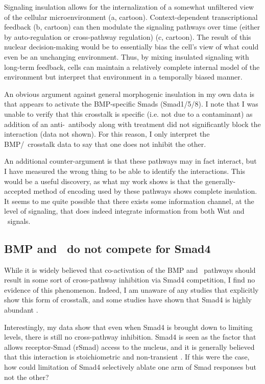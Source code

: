 Signaling insulation allows for the internalization of a
somewhat unfiltered view of the cellular microenvironment
(a, cartoon).
Context-dependent transcriptional feedback
(b, cartoon) can then modulate
the signaling pathways over time (either by auto-regulation or
cross-pathway regulation)
(c, cartoon). The result of this nuclear
decision-making would be to essentially bias the
cell's view of what could even be an unchanging environment. Thus,
by mixing insulated signaling with long-term feedback,
cells can maintain a relatively complete internal model
of the environment but interpret that environment in a
temporally biased manner.


An obvious argument against general morphogenic insulation
in my own data is that  appears
to activate the BMP-specific Smads (Smad1/5/8). I note that
I was unable to verify that this crosstalk is specific (i.e.
not due to a contaminant) as addition of an anti-\tgf\
antibody along with  treatment did not significantly block
the interaction (data not shown). For this reason, I only
interpret the BMP/\tgf\ crosstalk data to say that one does not
inhibit the other.


An additional counter-argument is that these pathways
may in fact interact, but I have measured the wrong
thing to be able to identify the interactions. This would
be a useful discovery, as what my work shows is that
the generally-accepted method of encoding used by these
pathways shows complete insulation. It seems to me quite
possible that there exists some information channel, at
the level of signaling, that does indeed integrate information
from both Wnt and \tgf\ signals.


\subsection{BMP and \tgf\ do not compete for Smad4}


While it is widely believed that co-activation of the
BMP and \tgf\ pathways should result in some sort of
cross-pathway inhibition via Smad4 competition, I find
no evidence of this phenomenon. Indeed, I am unaware
of any studies that explicitly show this form of crosstalk,
and some studies have shown that Smad4 is highly
abundant \cite{Nicolas2004,Clarke2006}.


Interestingly, my data show that even when Smad4
is brought down to limiting levels, there is still no
cross-pathway inhibition. Smad4 is seen as
the factor that allows receptor-Smad (rSmad) access to
the nucleus, and it is generally believed that this
interaction is stoichiometric and non-transient \cite{Warmflash2012}. 
If this were the case, how could limitation of Smad4
selectively ablate one arm of Smad responses but not the other?


